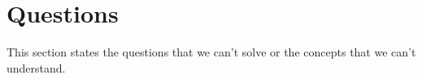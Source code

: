 
\section{Questions}
\label{sec:questions}

This section states the questions that we can't solve or the concepts that we can't understand.
\subsection{}
\label{sec:}



